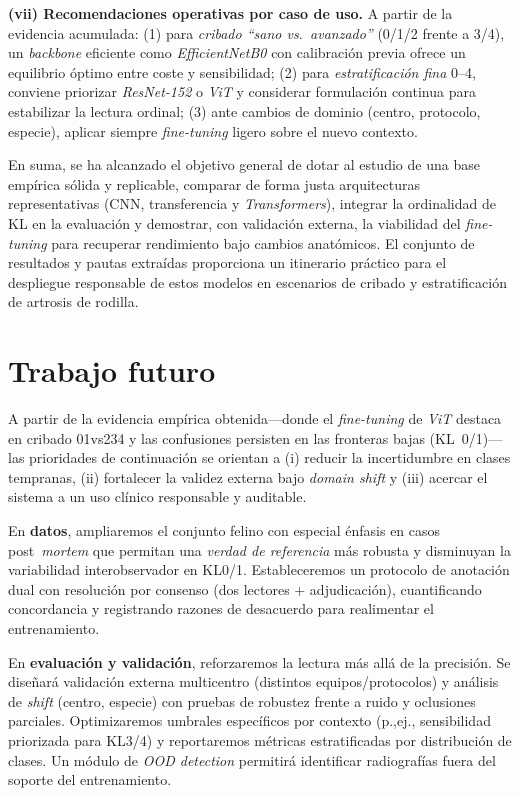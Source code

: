 \documentclass[11pt,spanish,listoffigures,listoftables]{tfgetsinf}
\begin{document}
\noindent\textbf{(vii) Recomendaciones operativas por caso de uso.}
A partir de la evidencia acumulada: (1) para \emph{cribado “sano vs.\ avanzado”} (0/1/2 frente a 3/4), un \emph{backbone} eficiente como \emph{EfficientNetB0} con calibración previa ofrece un equilibrio óptimo entre coste y sensibilidad; (2) para \emph{estratificación fina} 0--4, conviene priorizar \emph{ResNet-152} o \emph{ViT} y considerar formulación continua para estabilizar la lectura ordinal; (3) ante cambios de dominio (centro, protocolo, especie), aplicar siempre \emph{fine-tuning} ligero sobre el nuevo contexto.

\medskip
\noindent En suma, se ha alcanzado el objetivo general de dotar al estudio de una base empírica sólida y replicable, comparar de forma justa arquitecturas representativas (CNN, transferencia y \emph{Transformers}), integrar la ordinalidad de KL en la evaluación y demostrar, con validación externa, la viabilidad del \emph{fine-tuning} para recuperar rendimiento bajo cambios anatómicos. El conjunto de resultados y pautas extraídas proporciona un itinerario práctico para el despliegue responsable de estos modelos en escenarios de cribado y estratificación de artrosis de rodilla.




\section{Trabajo futuro}
A partir de la evidencia empírica obtenida—donde el \emph{fine-tuning} de \emph{ViT} destaca en cribado 01vs234 y las confusiones persisten en las fronteras bajas (KL~0/1)—las prioridades de continuación se orientan a (i) reducir la incertidumbre en clases tempranas, (ii) fortalecer la validez externa bajo \emph{domain shift} y (iii) acercar el sistema a un uso clínico responsable y auditable.

En \textbf{datos}, ampliaremos el conjunto felino con especial énfasis en casos post~\emph{mortem} que permitan una \emph{verdad de referencia} más robusta y disminuyan la variabilidad interobservador en KL0/1. Estableceremos un protocolo de anotación dual con resolución por consenso (dos lectores + adjudicación), cuantificando concordancia y registrando razones de desacuerdo para realimentar el entrenamiento.

En \textbf{evaluación y validación}, reforzaremos la lectura más allá de la precisión. Se diseñará validación externa multicentro (distintos equipos/protocolos) y análisis de \emph{shift} (centro, especie) con pruebas de robustez frente a ruido y oclusiones parciales. Optimizaremos umbrales específicos por contexto (p.,ej., sensibilidad priorizada para KL3/4) y reportaremos métricas estratificadas por distribución de clases. Un módulo de \emph{OOD detection} permitirá identificar radiografías fuera del soporte del entrenamiento.
\end{document}
